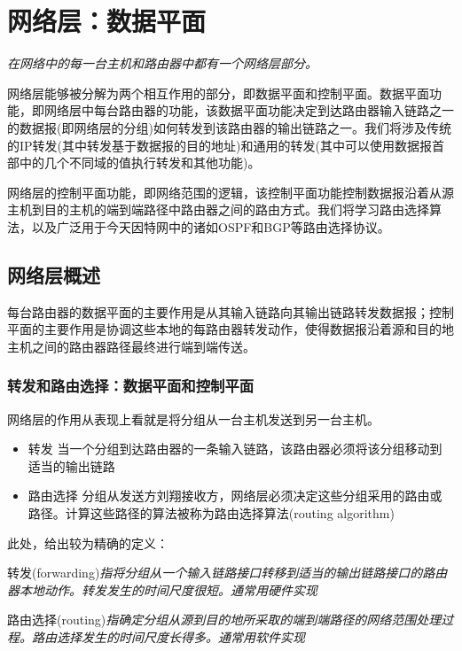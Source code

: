 \chapter{网络层：数据平面}

    \emph{在网络中的每一台主机和路由器中都有一个网络层部分。}

    网络层能够被分解为两个相互作用的部分，即数据平面和控制平面。数据平面功能，即网络层中每台路由器的功能，该数据平面功能决定到达路由器输入链路之一的数据报(即网络层的分组)如何转发到该路由器的输出链路之一。我们将涉及传统的IP转发(其中转发基于数据报的目的地址)和通用的转发(其中可以使用数据报首部中的几个不同域的值执行转发和其他功能)。

    网络层的控制平面功能，即网络范围的逻辑，该控制平面功能控制数据报沿着从源主机到目的主机的端到端路径中路由器之间的路由方式。我们将学习路由选择算法，以及广泛用于今天因特网中的诸如OSPF和BGP等路由选择协议。

\section{网络层概述}

    每台路由器的数据平面的主要作用是从其输入链路向其输出链路转发数据报；控制平面的主要作用是协调这些本地的每路由器转发动作，使得数据报沿着源和目的地主机之间的路由器路径最终进行端到端传送。

\subsection{转发和路由选择：数据平面和控制平面}

    网络层的作用从表现上看就是将分组从一台主机发送到另一台主机。

\begin{itemize}
    \item 转发
    \subitem 当一个分组到达路由器的一条输入链路，该路由器必须将该分组移动到适当的输出链路
    \item 路由选择
    \subitem 分组从发送方刘翔接收方，网络层必须决定这些分组采用的路由或路径。计算这些路径的算法被称为路由选择算法(routing algorithm)
\end{itemize}

    此处，给出较为精确的定义：
    
    转发(forwarding)\emph{指将分组从一个输入链路接口转移到适当的输出链路接口的路由器本地动作。转发发生的时间尺度很短。通常用硬件实现}

    路由选择(routing)\emph{指确定分组从源到目的地所采取的端到端路径的网络范围处理过程。路由选择发生的时间尺度长得多。通常用软件实现}

